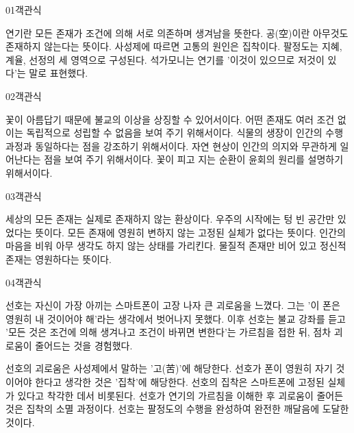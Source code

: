 \documentclass[fs85,seriesWit]{korfarm-base}
\begin{document}
\kfBeginMC
\begin{kfQBlock}{01}{객관식}
\begin{kfChoices}
\kfChoice 연기란 모든 존재가 조건에 의해 서로 의존하며 생겨남을 뜻한다.
\kfChoice 공(空)이란 아무것도 존재하지 않는다는 뜻이다.
\kfChoice 사성제에 따르면 고통의 원인은 집착이다.
\kfChoice 팔정도는 지혜, 계율, 선정의 세 영역으로 구성된다.
\kfChoice 석가모니는 연기를 '이것이 있으므로 저것이 있다'는 말로 표현했다.
\end{kfChoices}
\end{kfQBlock}

\begin{kfQBlock}{02}{객관식}
\begin{kfChoices}
\kfChoice 꽃이 아름답기 때문에 불교의 이상을 상징할 수 있어서이다.
\kfChoice 어떤 존재도 여러 조건 없이는 독립적으로 성립할 수 없음을 보여 주기 위해서이다.
\kfChoice 식물의 생장이 인간의 수행 과정과 동일하다는 점을 강조하기 위해서이다.
\kfChoice 자연 현상이 인간의 의지와 무관하게 일어난다는 점을 보여 주기 위해서이다.
\kfChoice 꽃이 피고 지는 순환이 윤회의 원리를 설명하기 위해서이다.
\end{kfChoices}
\end{kfQBlock}

\begin{kfQBlock}{03}{객관식}
\begin{kfChoices}
\kfChoice 세상의 모든 존재는 실제로 존재하지 않는 환상이다.
\kfChoice 우주의 시작에는 텅 빈 공간만 있었다는 뜻이다.
\kfChoice 모든 존재에 영원히 변하지 않는 고정된 실체가 없다는 뜻이다.
\kfChoice 인간의 마음을 비워 아무 생각도 하지 않는 상태를 가리킨다.
\kfChoice 물질적 존재만 비어 있고 정신적 존재는 영원하다는 뜻이다.
\end{kfChoices}
\end{kfQBlock}

\begin{kfQBlock}{04}{객관식}
\begin{kfEvidence}선호는 자신이 가장 아끼는 스마트폰이 고장 나자 큰 괴로움을 느꼈다. 그는 '이 폰은 영원히 내 것이어야 해'라는 생각에서 벗어나지 못했다. 이후 선호는 불교 강좌를 듣고 '모든 것은 조건에 의해 생겨나고 조건이 바뀌면 변한다'는 가르침을 접한 뒤, 점차 괴로움이 줄어드는 것을 경험했다.\end{kfEvidence}
\begin{kfChoices}
\kfChoice 선호의 괴로움은 사성제에서 말하는 '고(苦)'에 해당한다.
\kfChoice 선호가 폰이 영원히 자기 것이어야 한다고 생각한 것은 '집착'에 해당한다.
\kfChoice 선호의 집착은 스마트폰에 고정된 실체가 있다고 착각한 데서 비롯된다.
\kfChoice 선호가 연기의 가르침을 이해한 후 괴로움이 줄어든 것은 집착의 소멸 과정이다.
\kfChoice 선호는 팔정도의 수행을 완성하여 완전한 깨달음에 도달한 것이다.
\end{kfChoices}
\end{kfQBlock}
\end{document}
